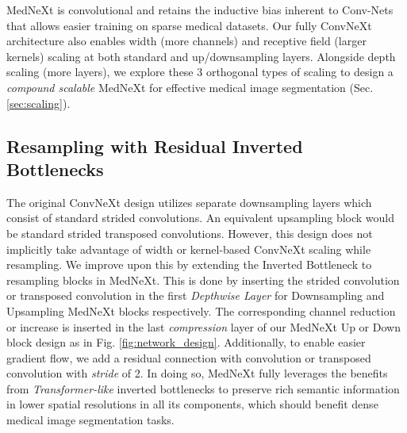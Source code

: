 \documentclass[runningheads]{llncs}
\begin{document}
MedNeXt is convolutional and retains the inductive bias inherent to Conv-Nets that allows easier training on sparse medical datasets. Our fully ConvNeXt architecture also enables width (more channels) and receptive field (larger kernels) scaling at both standard and up/downsampling layers. Alongside depth scaling (more layers), we explore these 3 orthogonal types of scaling to design a \textit{compound scalable} MedNeXt for effective medical image segmentation (Sec.\ref{sec:scaling}).


\subsection{Resampling with Residual Inverted Bottlenecks}
\label{sec:resampling}
The original ConvNeXt design utilizes separate downsampling layers which consist of standard strided convolutions. An equivalent upsampling block would be standard strided transposed convolutions. However, this design does not implicitly take advantage of width or kernel-based ConvNeXt scaling while resampling. We improve upon this by extending the Inverted Bottleneck to resampling blocks in MedNeXt. This is done by inserting the strided convolution or transposed convolution in the first \textit{Depthwise Layer} for Downsampling and Upsampling MedNeXt blocks respectively. The corresponding channel reduction or increase is inserted in the last \textit{compression} layer of our MedNeXt  Up or Down block design as in Fig. \ref{fig:network_design}. Additionally, to enable easier gradient flow, we add a residual connection with  convolution or transposed convolution with \textit{stride} of 2. In doing so, MedNeXt fully leverages the benefits from \textit{Transformer-like} inverted bottlenecks to preserve rich semantic information in lower spatial resolutions in all its components, which should benefit dense medical image segmentation tasks.
\end{document}
